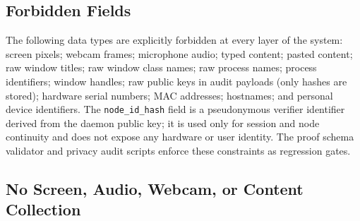 \documentclass[conference]{IEEEtran}
\begin{document}
\begin{table}[t]
\centering
\small
\caption{Privacy Collection Boundary}
\label{tab:privacy}
\end{table}

\subsection{Forbidden Fields}

The following data types are explicitly forbidden at every layer of the system: screen pixels; webcam frames; microphone audio; typed content; pasted content; raw window titles; raw window class names; raw process names; process identifiers; window handles; raw public keys in audit payloads (only hashes are stored); hardware serial numbers; MAC addresses; hostnames; and personal device identifiers. The \texttt{node\_id\_hash} field is a pseudonymous verifier identifier derived from the daemon public key; it is used only for session and node continuity and does not expose any hardware or user identity. The proof schema validator and privacy audit scripts enforce these constraints as regression gates.

\subsection{No Screen, Audio, Webcam, or Content Collection}
\end{document}
